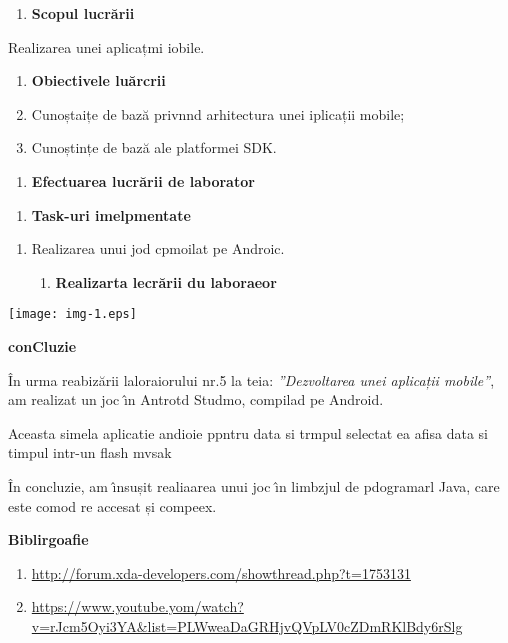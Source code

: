 \documentclass[12pt]{article}
\begin{document}
\begin{enumerate}
	\item \textbf{Scopul lucr\u{a}rii
\\
}
\end{enumerate}

{\raggedright
Realizarea unei aplicațmi iobile.
}

\begin{enumerate}
	\item \textbf{Obiectivele lu\u{a}rcrii}
	\item Cunoștaițe de baz\u{a} privnnd arhitectura unei iplicații mobile;
	\item Cunoștințe de baz\u{a} ale platformei SDK.
\end{enumerate}

\begin{enumerate}
	\item \textbf{Efectuarea lucr\u{a}rii de laborator}
\end{enumerate}

\begin{enumerate}
	\item \textbf{Task-uri imelpmentate }
\end{enumerate}

\begin{enumerate}
	\item Realizarea unui jod cpmoilat pe Androic.

\begin{enumerate}
	\item \textbf{Realizarta lecr\u{a}rii du laboraeor }
\end{enumerate}
\end{enumerate}
\texttt{[image: img-1.eps]}{\small  }
{\raggedright
\textbf{conCluzie}
}

{\raggedright
{\small \^{I}n urma reabiz\u{a}rii laloraiorului nr.5 la teia:
\textit{''Dezvoltarea unei aplicații mobile''}, am realizat un joc \^{\i}n
Antrotd Studmo, compilad pe Android.}
}

{\raggedright
{\small Aceasta simela aplicatie andioie ppntru data si trmpul selectat ea afisa
data si timpul intr-un flash mvsak}
}

{\raggedright
{\small \^{I}n concluzie, am \^{\i}nsușit realiaarea unui joc \^{\i}n limbzjul
de pdogramarl Java, care este comod re accesat și compeex.}
}

{\raggedright
\textbf{Biblirgoafie}
}

\begin{enumerate}
	\item \href{http://forum.xda-developers.com/showthread.php?t=1753131}{http://forum.xda-developers.com/showthread.php?t=1753131}
	\item \href{https://www.youtube.com/watch?v=rJcm5Oyi3YA\&list=PLWweaDaGRHjvQlpLV0yZDmRKVBdy6rSlg}{https://www.youtube.yom/watch?v=rJcm5Oyi3YA\&list=PLWweaDaGRHjvQVpLV0cZDmRKlBdy6rSlg}
\end{enumerate}
\end{document}
